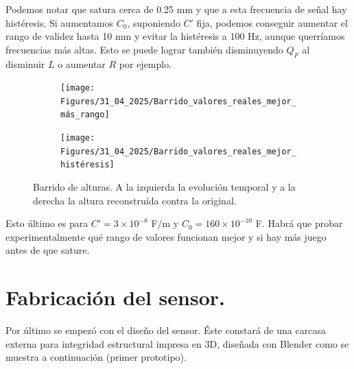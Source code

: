 Podemos notar que satura cerca de 0.25 mm y que a esta frecuencia de señal hay histéresis.	Si aumentamos $C_0$, suponiendo $C'$ fija, podemos conseguir aumentar el rango de validez hasta 10 mm y evitar la histéresis a 100 Hz, aunque querríamos frecuencias más altas. Esto se puede lograr también disminuyendo $Q_F$ al disminuir $L$ o aumentar $R$ por ejemplo.

\begin{figure}[!ht]
	\begin{minipage}[c]{0.5\textwidth}
		\begin{subfigure}{\textwidth}
			\centering
			\texttt{[image: Figures/31\_04\_2025/Barrido\_valores\_reales\_mejor\_más\_rango]}
			\captionsetup{width=0.8\textwidth}
			\subcaption{}
		\end{subfigure}
	\end{minipage}\begin{minipage}[c]{0.49\textwidth}
		\begin{subfigure}{\textwidth}
			\centering
			\texttt{[image: Figures/31\_04\_2025/Barrido\_valores\_reales\_mejor\_histéresis]}
			\captionsetup{width=0.8\textwidth}
			\subcaption{}
		\end{subfigure}
	\end{minipage}
	\caption{Barrido de alturas. A la izquierda la evolución temporal y a la derecha la altura reconstruída contra la original.}
	\label{fig:Barrido_alturas_mejor}
\end{figure}

Esto último es para $C'=3\times10^{-8}$ F/m y $C_0=160\times10^{-10}$ F. Habrá que probar experimentalmente qué rango de valores funcionan mejor y si hay más juego antes de que sature.

\clearpage
\section{Fabricación del sensor.}
Por último se empezó con el diseño del sensor. Éste constará de una carcasa externa para integridad estructural impresa en 3D, diseñada con Blender como se muestra a continuación (primer prototipo).

